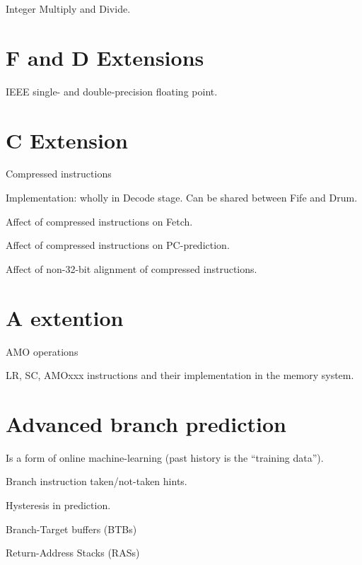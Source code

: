 Integer Multiply and Divide.


\section{F and D Extensions}

IEEE single- and double-precision floating point.


\section{C Extension}

Compressed instructions

Implementation: wholly in Decode stage.  Can be shared between Fife and Drum.

Affect of compressed instructions on Fetch.

Affect of compressed instructions on PC-prediction.

Affect of non-32-bit alignment of compressed instructions.


\section{A extention}

AMO operations

LR, SC, AMOxxx instructions and their implementation in the memory system.


\section{Advanced branch prediction}

Is a form of online machine-learning (past history is the ``training data'').

Branch instruction taken/not-taken hints.

Hysteresis in prediction.

Branch-Target buffers (BTBs)

Return-Address Stacks (RASs)



